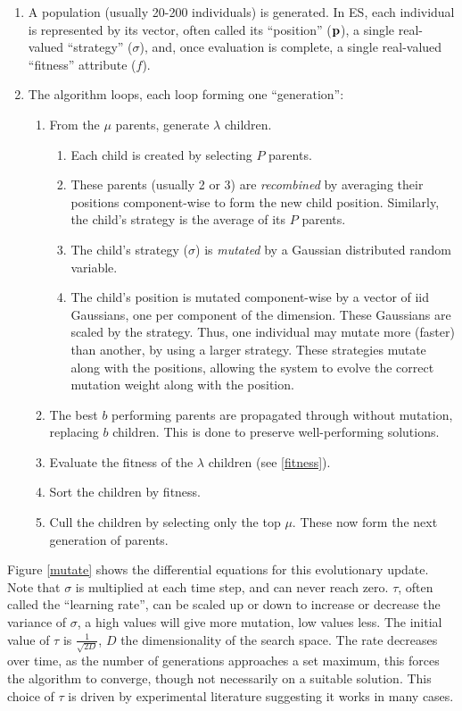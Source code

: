 \documentclass[10pt,a4paper]{report}
\begin{document}
\begin{enumerate}
\item A population (usually 20-200 individuals) is generated. In ES, each individual is represented by its vector, often called its ``position'' ($\bf{p}$), a single real-valued ``strategy'' ($\sigma$), and, once evaluation is complete, a single real-valued ``fitness'' attribute ($f$).
\item The algorithm loops, each loop forming one ``generation'':
	\begin{enumerate}
	\item From the $\mu$ parents, generate $\lambda$ children.
		\begin{enumerate}
		\item Each child is created by selecting $P$ parents.
		\item These parents (usually 2 or 3) are \emph{recombined} by averaging their positions component-wise to form the new child position. Similarly, the child's strategy is the average of its $P$ parents.
		\item	The child's strategy ($\sigma$) is \emph{mutated} by a Gaussian distributed random variable.
		\item The child's position is mutated component-wise by a vector of iid Gaussians, one per component of the dimension. These Gaussians are scaled by the strategy. Thus, one individual may mutate more (faster) than another, by using a larger strategy. These strategies mutate along with the positions, allowing the system to evolve the correct mutation weight along with the position.
		\end{enumerate}
	\item The best $b$ performing parents are propagated through without mutation, replacing $b$ children. This is done to preserve well-performing solutions.
	\item Evaluate the fitness of the $\lambda$ children (see \ref{fitness}).
	\item Sort the children by fitness.
	\item Cull the children by selecting only the top $\mu$. These now form the next generation of parents.
	\end{enumerate}
\end{enumerate}

Figure \ref{mutate} shows the differential equations for this evolutionary update. Note that $\sigma$ is multiplied at each time step, and can never reach zero. $\tau$, often called the ``learning rate'', can be scaled up or down to increase or decrease the variance of $\sigma$, a high values will give more mutation, low values less. The initial value of $\tau$ is $\frac{1}{\sqrt{2D}}$, $D$ the dimensionality of the search space. The rate decreases over time, as the number of generations approaches a set maximum, this forces the algorithm to converge, though not necessarily on a suitable solution. This choice of $\tau$ is driven by experimental literature suggesting it works in many cases\cite{Beyer:2007}.
\end{document}

